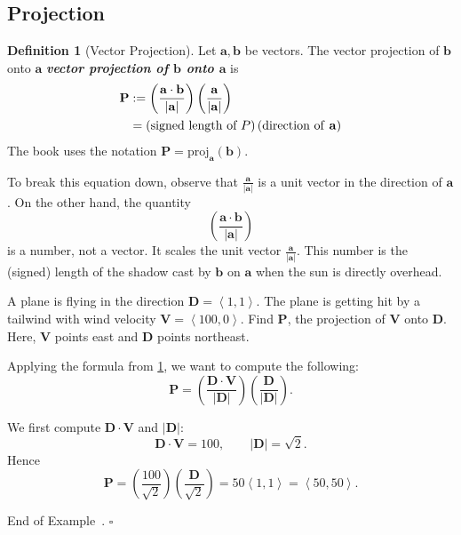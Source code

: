 \documentclass[10pt]{article}
\DeclareRobustCommand{\demph}[1]{%
  \ifmmode
  {\color{Blue}#1}%
  \else
  {\color{Blue}\bfseries\slshape #1}%
  \fi
}
\theoremstyle{definition}
\newtheorem{definition}[theorem]{Definition}
\newtheorem{example}[theorem]{Example}
\renewenvironment{example}
{\begin{oldexample}}
  {\par\smallskip\hfill   End of Example~\theexample. $\square$    \par\end{oldexample}}
\newcommand{\1}[1]{\textbf{1}_{\left[#1\right]}} %
\begin{document}
\subsection{Projection}
\begin{definition}[Vector Projection]
  \label{def:vector-projection}
  Let $\mathbf{a},\mathbf{b}$ be vectors. The \demph{vector projection of $\mathbf{b}$ onto $\mathbf{a}$} is
  \begin{align*}
    \mathbf{P}
    &:= \left( \frac{\mathbf{a}\cdot \mathbf{b}}{|\mathbf{a}|} \right) \left(\frac{\mathbf{a}}{|\mathbf{a}|}\right)\\
    &= \left( \text{signed length of }P \right)\left( \text{direction of \textbf{a}} \right) \nonumber
  \end{align*}
  The book uses the notation $\mathbf{P} = \text{proj}_{\mathbf{a}}(\mathbf{b})$.
\end{definition}

To break this equation down, observe that $\frac{\mathbf{a}}{|\mathbf{a}|}$ is a unit vector in the direction
of $\mathbf{a}$. On the other hand, the quantity
\begin{equation*}
  \left( \frac{\mathbf{a}\cdot \mathbf{b}}{|\mathbf{a}|} \right) 
\end{equation*}
is a number, not a vector. It scales the unit vector
$\frac{\mathbf{a}}{|\mathbf{a}|}$. This number is the (signed) length of the
shadow cast by $\mathbf{b}$ on $\mathbf{a}$ when the sun is directly overhead.




\begin{example}
  A plane is flying in the direction $\mathbf{D}=\left\langle 1,1 \right\rangle $. The plane is getting hit
  by a tailwind with wind velocity $\mathbf{V}=\left\langle 100,0 \right\rangle$. Find $\mathbf{P}$, the projection
  of $\mathbf{V}$ onto $\mathbf{D}$. Here, $\mathbf{V}$ points east and $\mathbf{D}$ points northeast.


  Applying the formula from \cref{def:vector-projection}, we want to compute
  the following:
  \begin{equation*}
    \mathbf{P} = \left( \frac{\mathbf{D}\cdot \mathbf{V}}{|\mathbf{D}|} \right) \left( \frac{\mathbf{D}}{|\mathbf{D}|} \right).  
  \end{equation*}

  We first compute $\mathbf{D}\cdot \mathbf{V}$ and $|\mathbf{D}|$:
  \begin{equation*}
    \mathbf{D}\cdot \mathbf{V}  = 100, \qquad |\mathbf{D}| = \sqrt{2}.
  \end{equation*}
  Hence
  \begin{equation*}
    \mathbf{P} = \left( \frac{100}{\sqrt{2}} \right) \left( \frac{\mathbf{D}}{\sqrt{2}} \right) = 50 \left\langle 1,1 \right\rangle  = \left\langle 50,50 \right\rangle.
  \end{equation*}
\end{example}
\end{document}
